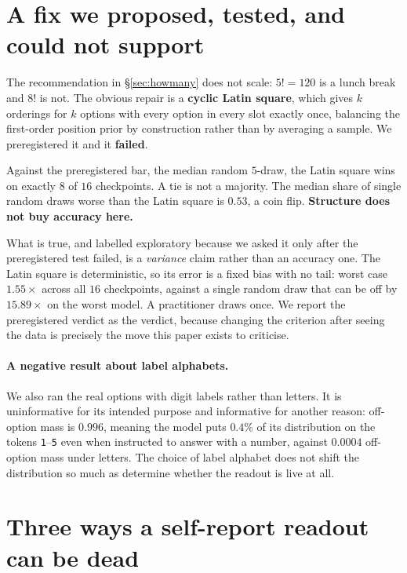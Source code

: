 \documentclass{article}
\begin{document}
\section{A fix we proposed, tested, and could not support}
\label{sec:latin}

The recommendation in \S\ref{sec:howmany} does not scale: $5! = 120$ is a lunch break and $8!$ is
not. The obvious repair is a \textbf{cyclic Latin square}, which gives $k$ orderings for $k$ options
with every option in every slot exactly once, balancing the first-order position prior by
construction rather than by averaging a sample. We preregistered it and it \textbf{failed}.

Against the preregistered bar, the median random $5$-draw, the Latin square wins on exactly $8$ of
$16$ checkpoints. A tie is not a majority. The median share of single random draws worse than the
Latin square is $0.53$, a coin flip. \textbf{Structure does not buy accuracy here.}

What is true, and labelled exploratory because we asked it only after the preregistered test failed,
is a \emph{variance} claim rather than an accuracy one. The Latin square is deterministic, so its
error is a fixed bias with no tail: worst case $1.55\times$ across all $16$ checkpoints, against a
single random draw that can be off by $15.89\times$ on the worst model. A practitioner draws once.
We report the preregistered verdict as the verdict, because changing the criterion after seeing the
data is precisely the move this paper exists to criticise.

\paragraph{A negative result about label alphabets.} We also ran the real options with digit
labels rather than letters. It is uninformative for its intended purpose and informative for
another reason: off-option mass is $0.996$, meaning the model puts $0.4\%$ of its distribution on
the tokens \texttt{1}--\texttt{5} even when instructed to answer with a number, against $0.0004$
off-option mass under letters. The choice of label alphabet does not shift the distribution so much
as determine whether the readout is live at all.

\section{Three ways a self-report readout can be dead}
\end{document}
